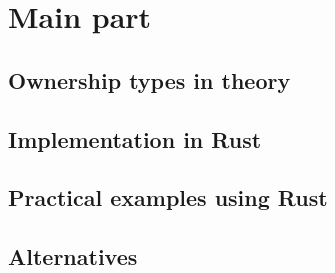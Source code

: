 \documentclass[sigplan,11pt,nonacm]{acmart}
\begin{document}
\section{Main part}
\label{sec:mainpart}


\subsection{Ownership types in theory}


\subsection{Implementation in Rust}






\subsection{Practical examples using Rust}


\subsection{Alternatives}
\end{document}
